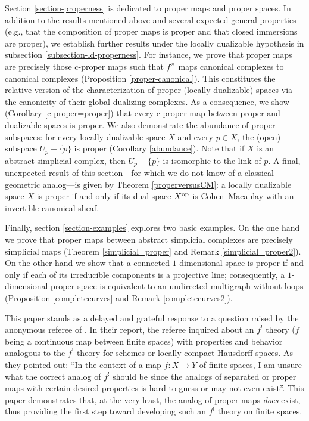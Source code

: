 \documentclass[amssymb,amscd,11pt,20pt]{amsart}
\newcommand{\0}{\mathbf 0}
\theoremstyle{plain}
\numberwithin{equation}{thm}
\begin{document}
Section \ref{section-properness} is dedicated to proper maps and proper spaces. In addition to the results mentioned above and several expected general properties (e.g., that the composition of proper maps is proper and that closed immersions are proper), we establish further results under the locally dualizable hypothesis in subsection \ref{subsection-ld-properness}.  For instance, we prove that proper maps are precisely those c-proper maps such that $f^\times $ maps canonical complexes to canonical complexes (Proposition \ref{proper-canonical}). This constitutes the relative version of the characterization of proper (locally dualizable) spaces via the canonicity of their global dualizing complexes.
As a consequence, we show (Corollary \ref{c-proper=proper})  that every c-proper map between proper and dualizable spaces is proper. We also demonstrate the abundance of proper subspaces: for every locally dualizable space $X$ and every $p\in X$, the (open) subspace $U_p-\{p\}$ is proper (Corollary \ref{abundance}). Note that if $X$ is an abstract simplicial complex, then $U_p-\{p\}$ is  isomorphic to  the link of $p$. A final, unexpected result of this section—for which we do not know of a classical geometric analog—is given by Theorem \ref{properversusCM}: a locally dualizable space $X$ is proper if and only if its dual space $X^{\rm op}$ is Cohen--Macaulay with an invertible canonical sheaf.

Finally, section \ref{section-examples} explores two basic examples. On the one hand we prove that proper maps between abstract simplicial complexes are precisely simplicial maps (Theorem \ref{simplicial=proper} and Remark \ref{simplicial=proper2}). On the other hand we show that a connected $1$-dimensional space is proper if and only if each of its irreducible components   is a  projective line; consequently, a $1$-dimensional proper space is equivalent to an undirected multigraph without loops (Proposition \ref{completecurves} and Remark \ref{completecurves2}).

This paper stands as a delayed and grateful response to a question raised by the anonymous referee of \cite{ST2}. In their report, the referee inquired about an $f^!$ theory ($f$ being a continuous map between finite spaces) with properties and behavior analogous to the $f^!$ theory for schemes or locally compact Hausdorff spaces. As they pointed out: ``In the context of a map $f \colon X \to Y$ of finite spaces, I am unsure what the correct analog of $f^!$ should be since the analogs of separated or proper maps with certain desired properties is hard to guess or may not even exist''. This paper demonstrates that, at the very least, the analog of proper maps \emph{does} exist, thus providing the first step toward developing such an $f^!$ theory on finite spaces.
\end{document}
